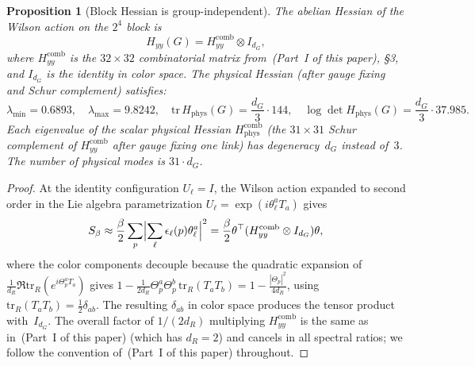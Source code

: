 \documentclass[11pt]{article}
\newtheorem{proposition}[theorem]{Proposition}
\theoremstyle{definition}
\newcommand{\tr}{\mathrm{tr}}
\begin{document}
\begin{proposition}[Block Hessian is group-independent]
\label{sun-prop:hessian}
The abelian Hessian of the Wilson action on the $2^4$
block is
\begin{equation}\label{sun-eq:hessian}
H_{yy}(G)=H_{yy}^{\mathrm{comb}}\otimes I_{d_G},
\end{equation}
where $H_{yy}^{\mathrm{comb}}$ is the $32\times 32$
combinatorial matrix from~\textup{(Part~I of this paper)},
\S3, and $I_{d_G}$ is the identity in color space.
The physical Hessian (after gauge fixing and Schur
complement) satisfies:
\begin{equation}\label{sun-eq:phys-spectrum}
\lambda_{\min}=0.6893,\quad
\lambda_{\max}=9.8242,\quad
\tr\,H_{\mathrm{phys}}(G)=\frac{d_G}{3}\cdot 144,\quad
\log\det H_{\mathrm{phys}}(G)=\frac{d_G}{3}\cdot 37.985.
\end{equation}
Each eigenvalue of the scalar physical Hessian
$H_{\mathrm{phys}}^{\mathrm{comb}}$
(the $31\times 31$ Schur complement of
$H_{yy}^{\mathrm{comb}}$ after gauge fixing one link)
has degeneracy~$d_G$ instead of~$3$.
The number of physical modes is $31\cdot d_G$.
\end{proposition}

\begin{proof}
At the identity configuration $U_\ell=I$, the Wilson
action expanded to second order in the Lie algebra
parametrization $U_\ell=\exp(i\theta_\ell^a T_a)$ gives
\begin{equation}
S_\beta\approx\frac{\beta}{2}\sum_p
\Bigl|\sum_\ell\epsilon_\ell(p)\theta_\ell^a\Bigr|^2
=\frac{\beta}{2}\theta^\top(H_{yy}^{\mathrm{comb}}
\otimes I_{d_G})\theta,
\end{equation}
where the color components decouple because the quadratic
expansion of $\frac{1}{d_R}\Re\tr_R(e^{i\Theta_p^a T_a})$
gives $1-\frac{1}{2d_R}\Theta_p^a\Theta_p^b
\,\tr_R(T_a T_b)=1-\frac{|\Theta_p|^2}{4d_R}$,
using $\tr_R(T_a T_b)=\frac{1}{2}\delta_{ab}$.
The resulting $\delta_{ab}$ in color space produces
the tensor product with~$I_{d_G}$.
The overall factor of $1/(2d_R)$ multiplying
$H_{yy}^{\mathrm{comb}}$ is the same as
in~\textup{(Part~I of this paper)} (which has $d_R=2$)
and cancels in all spectral ratios; we follow
the convention of~\textup{(Part~I of this paper)} throughout.
\end{proof}
\end{document}
